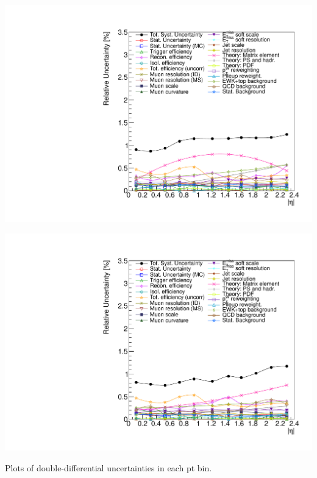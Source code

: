 {
\colb[T]
\centering
{}
\includegraphics[width=1.0\textwidth]{dates/20130602/figures/v26.allqcd/Wmn_SYSTEM_1D_PT25_NEG_Unc_proj}

\centering
{}
\includegraphics[width=1.0\textwidth]{dates/20130602/figures/v26.allqcd/Wmn_SYSTEM_1D_PT25_POS_Unc_proj}
\cole
}

{
Plots of double-differential uncertainties in each pt bin.
}

